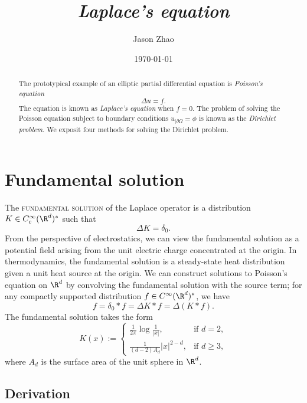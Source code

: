 \documentclass[reqno]{amsart}
\title
{
	\emph{Laplace's equation}
}
\author{Jason Zhao}
\date{\today}
\theoremstyle{definition}
\theoremstyle{remark}
\newcounter{problem}[section]	\declaretheorem[style=thmrecbox,name=Problem, numberlike=problem]{statement}
\renewcommand{\emph}{\textsc}
\begin{document}
\maketitle

\begin{abstract}
	The prototypical example of an elliptic partial differential equation is \textit{Poisson's equation}
		\[ \Delta u = f. \]
	The equation is known as \textit{Laplace's equation} when $f = 0$. The problem of solving the Poisson equation subject to boundary conditions $u_{|\partial \Omega} = \phi$ is known as the \textit{Dirichlet problem}. We exposit four methods for solving the Dirichlet problem.
\end{abstract}

\tableofcontents

\section{Fundamental solution}

The \emph{fundamental solution} of the Laplace operator is a distribution $K \in C^\infty_c (\R^d)^*$ such that 
	\[ \Delta K = \delta_0. \]
From the perspective of electrostatics, we can view the fundamental solution as a potential field arising from the unit electric charge concentrated at the origin. In thermodynamics, the fundamental solution is a steady-state heat distribution given a unit heat source at the origin. We can construct solutions to Poisson's equation on $\R^d$ by convolving the fundamental solution with the source term; for any compactly supported distribution $f \in C^\infty (\R^d)^*$, we have
	\[ f = \delta_0 * f = \Delta K * f = \Delta (K * f). \]
The fundamental solution takes the form
	\[ K(x) :=
		\begin{cases}
			\frac{1}{2\pi}\log \frac{1}{|x|}, 		&\text{if } d = 2, \\
			\frac{1}{(d - 2) A_d} |x|^{2 - d} ,	&\text{if } d \geq 3,
		\end{cases}
	 \]
where $A_d$ is the surface area of the unit sphere in $\R^d$. 
	
\subsection{Derivation}
	
\end{document}
